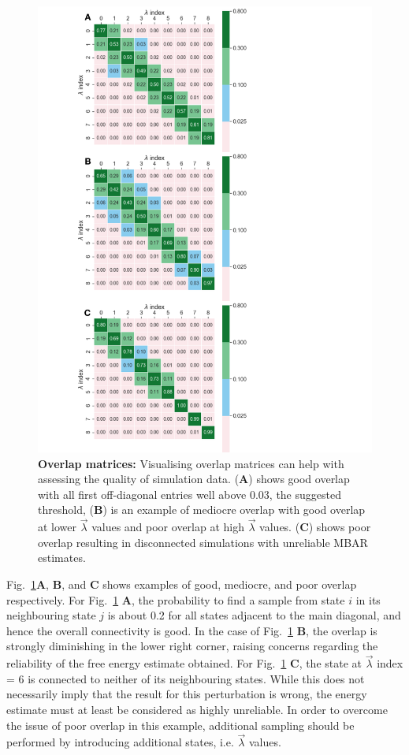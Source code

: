 \documentclass[9pt,bestpractices,pubversion]{livecoms}
\begin{document}
\begin{figure}
\includegraphics[width=0.90\columnwidth]{figures/fig12_overlap/Figure.pdf}
\caption{\label{fig:overlap} \textbf{Overlap matrices:} Visualising overlap matrices can help with assessing the quality of simulation data. (\textbf{A}) shows good overlap with all first off-diagonal entries well above 0.03, the suggested threshold, (\textbf{B}) is an example of mediocre overlap with good overlap at lower $\vec{\lambda}$ values and poor overlap at high $\vec{\lambda}$ values. (\textbf{C}) shows poor overlap resulting in disconnected simulations with unreliable MBAR estimates.}
\end{figure}

Fig.~\ref{fig:overlap}\textbf{A}, \textbf{B}, and \textbf{C} shows examples of good, mediocre, and poor overlap respectively. For Fig.~\ref{fig:overlap} \textbf{A}, the probability to find a sample from state $i$ in its neighbouring state $j$ is about 0.2 for all states adjacent to the main diagonal, and hence the overall connectivity is good. In the case of Fig.~\ref{fig:overlap} \textbf{B}, the overlap is strongly diminishing in the lower right corner, raising concerns regarding the reliability of the free energy estimate obtained. For Fig.~\ref{fig:overlap} \textbf{C}, the state at $\vec{\lambda}$ index = 6 is connected to neither of its neighbouring states. While this does not necessarily imply that the result for this perturbation is wrong, the energy estimate must at least be considered as highly unreliable.
In order to overcome the issue of poor overlap in this example, additional sampling should be performed by introducing additional states, i.e. $\vec{\lambda}$ values.
\end{document}
